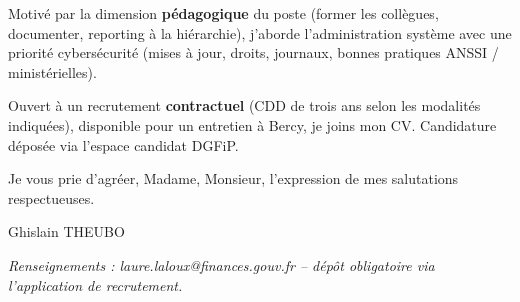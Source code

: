\documentclass[11pt,a4paper]{article}
\begin{document}
\noindent Motiv\'e par la dimension \textbf{p\'edagogique} du poste (former les coll\`egues, documenter, reporting \`a la hi\'erarchie), j'aborde l'administration syst\`eme avec une priorit\'e cybers\'ecurit\'e (mises \`a jour, droits, journaux, bonnes pratiques ANSSI / minist\'erielles).

\vspace{0.35em}
\noindent Ouvert \`a un recrutement \textbf{contractuel} (CDD de trois ans selon les modalit\'es indiqu\'ees), disponible pour un entretien \`a Bercy, je joins mon CV. Candidature d\'epos\'ee via l'espace candidat DGFiP.

\vspace{0.55em}
\noindent Je vous prie d'agr\'eer, Madame, Monsieur, l'expression de mes salutations respectueuses.

\vspace{1.1em}
\noindent Ghislain THEUBO

\vspace{0.5em}
\noindent\textit{\small Renseignements : laure.laloux@finances.gouv.fr -- d\'ep\^ot obligatoire via l'application de recrutement.}
\end{document}
